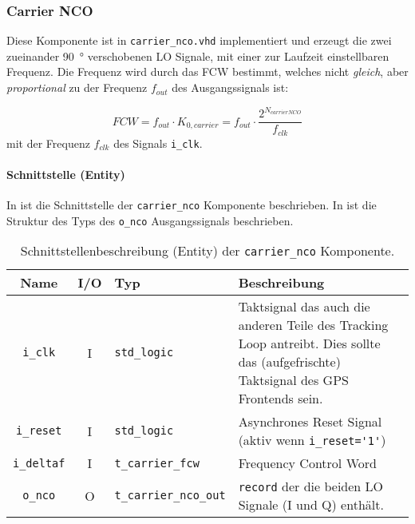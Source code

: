 \subsubsection{Carrier NCO}
Diese Komponente ist in  \lstinline$carrier_nco.vhd$ implementiert und erzeugt die zwei zueinander \SI{90}{\degree} verschobenen LO Signale, mit einer zur Laufzeit einstellbaren Frequenz. Die Frequenz wird durch das \gls{FCW} bestimmt, welches nicht \emph{gleich}, aber \emph{proportional} zu der Frequenz $f_{out}$ des Ausgangssignals ist:

\begin{equation}
    FCW=f_{out}\cdot K_{0,carrier} =f_{out}\cdot  \frac{2^{N_{carrierNCO}}}{f_{clk}}
\end{equation}
mit der Frequenz $f_{clk}$ des Signals \lstinline$i_clk$.


\paragraph{Schnittstelle (Entity)}
In  ist die Schnittstelle der \lstinline$carrier_nco$ Komponente beschrieben. In  ist die Struktur des Typs des \lstinline$o_nco$ Ausgangssignals beschrieben.

\begin{table}[htbp]
    \ttabbox
    {
        \caption[Carrier NCO Schnittstelle]{Schnittstellenbeschreibung (Entity) der \lstinline$carrier_nco$ Komponente.}
        \label{TabCarrierNCO_Entity}
    }
    {
    \begin{tabular}{c c  p{2cm} p{6cm}}
        \toprule
        Name                    & I/O  & Typ                               & Beschreibung \\
        \midrule
        \lstinline$i_clk$       & I         & \lstinline$std_logic$             & Taktsignal das auch die anderen Teile des Tracking Loop antreibt. Dies sollte das (aufgefrischte) Taktsignal des GPS Frontends sein.\\
        \lstinline$i_reset$     & I         & \lstinline$std_logic$             & Asynchrones Reset Signal (aktiv wenn \lstinline$i_reset='1'$) \\
        \lstinline$i_deltaf$    & I         & \lstinline$t_carrier_fcw$             & Frequency Control Word \\
        \lstinline$o_nco$       & O         & \lstinline$t_carrier_nco_out$ & \lstinline$record$ der die beiden LO Signale (I und Q) enthält. \\
        \bottomrule
    \end{tabular}
}
\end{table}

